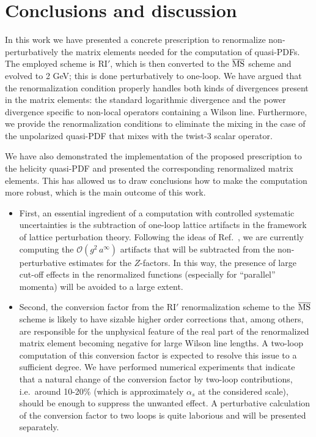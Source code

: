 \documentclass[12pt,tighten,nofootinbib,amssymb,floatfix]{article}
\newcommand{\MSb}{{\overline{\rm MS}}}
\begin{document}
\section{Conclusions and discussion}

In this work we have presented a concrete prescription to renormalize non-perturbatively the matrix elements needed 
for the computation of quasi-PDFs. The employed scheme is RI$'$, which is then converted to the $\MSb$ scheme and evolved to 2 GeV; this is done
perturbatively to one-loop. We have argued that the renormalization condition properly handles both kinds of divergences present in the 
matrix elements: the standard logarithmic divergence and the power divergence specific to non-local operators containing a Wilson line. Furthermore,
we provide the renormalization conditions to eliminate the mixing in the case of the unpolarized quasi-PDF that mixes with the twist-3 scalar operator.

\medskip
We have also demonstrated the implementation of the proposed prescription to the helicity quasi-PDF and presented the corresponding renormalized 
matrix elements. This has allowed us to draw conclusions how to make the computation more robust, which is the main outcome of this work.
\begin{itemize}
\item First, an essential ingredient of a computation with controlled systematic uncertainties is the subtraction of one-loop lattice artifacts in the framework 
of lattice perturbation theory.
Following the ideas of Ref.~\cite{Alexandrou:2015sea}, we are currently computing the $\mathcal{O}(g^2\,a^\infty)$ artifacts that will be subtracted 
from the non-perturbative estimates for the $Z$-factors. In this way, the presence of large cut-off effects in the renormalized functions (especially
for ``parallel'' momenta) will be avoided to a large extent. 
\item Second, the conversion factor from the RI$'$ renormalization scheme to the $\MSb$ 
scheme is likely to have sizable higher order corrections that, among others, are responsible for the unphysical feature of the real part of the renormalized 
matrix element becoming negative for large Wilson line lengths. A two-loop computation of this conversion factor is expected to resolve this issue 
to a sufficient degree. We have performed numerical experiments that indicate that a natural change of the conversion factor by two-loop contributions, 
i.e.\ around 10-20\% (which is approximately $\alpha_s$ at the considered scale), should be enough to suppress the unwanted effect. A perturbative
calculation of the conversion factor to two loops is quite laborious and will be presented separately.
\end{itemize}
\end{document}
